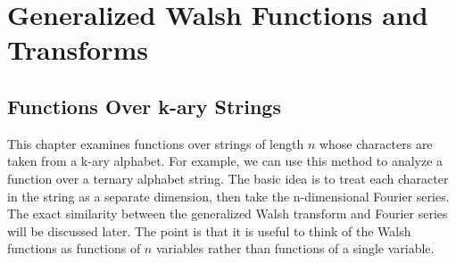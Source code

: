 \typeout{}

\chapter{Generalized Walsh Functions and Transforms}
\section{Functions Over k-ary Strings}
This chapter examines functions over strings of length $n$ whose
characters are
taken from a k-ary alphabet.  For example, we can use this method to analyze
a function over a ternary alphabet string.  
The basic idea is to treat each character in the string as a separate
dimension, then take the n-dimensional Fourier series.  The exact similarity
between the generalized Walsh transform and Fourier series will be discussed
later.  The point is that it is useful to think of the Walsh functions
as functions of $n$ variables rather than functions of a single variable.
